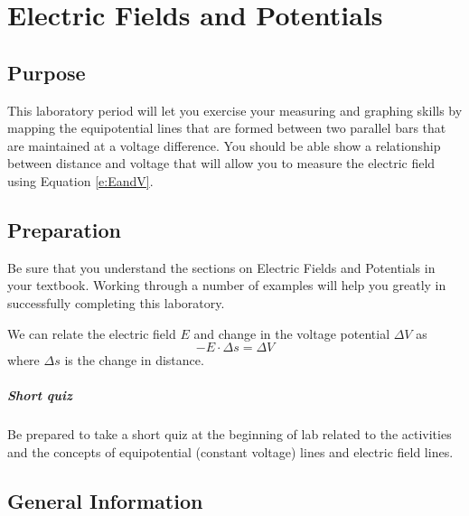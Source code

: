 
\chapter{Electric Fields and Potentials}

\section{Purpose}
This laboratory period will let you exercise your measuring and graphing skills by mapping the equipotential lines that are formed between two parallel bars that are maintained at a voltage difference.  You should be able show a relationship between distance and voltage that will allow you to measure the electric field using Equation \ref{e:EandV}.

\section{Preparation}
Be sure that you understand the sections on Electric Fields and Potentials in your textbook. Working through a number of examples will help you greatly in successfully completing this laboratory.

We can relate the electric field $E$ and change in the voltage potential $\Delta V$ as
\begin{equation} \label{e:EandV} -E\cdot \Delta s = \Delta V \end{equation}
where $\Delta s$ is the change in distance.

\paragraph{Short quiz} Be prepared to take a short quiz at the beginning of lab related to the activities and the concepts of equipotential (constant voltage) lines and electric field lines.

\section{General Information}

